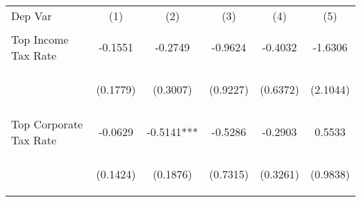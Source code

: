 \begin{center}
\begin{tabular}{lccccc}
\hline \noalign{\smallskip}Dep Var & (1) & (2) & (3) & (4) & (5)\\
\noalign{\smallskip}\hline \noalign{\smallskip}Top Income Tax Rate & \begin{scriptsize}-0.1551\end{scriptsize} & \begin{scriptsize}-0.2749\end{scriptsize} & \begin{scriptsize}-0.9624\end{scriptsize} & \begin{scriptsize}-0.4032\end{scriptsize} & \begin{scriptsize}-1.6306\end{scriptsize}\\
 & \begin{scriptsize}(0.1779)\end{scriptsize} & \begin{scriptsize}(0.3007)\end{scriptsize} & \begin{scriptsize}(0.9227)\end{scriptsize} & \begin{scriptsize}(0.6372)\end{scriptsize} & \begin{scriptsize}(2.1044)\end{scriptsize}\\
\noalign{\smallskip}Top Corporate Tax Rate & \begin{scriptsize}-0.0629\end{scriptsize} & \begin{scriptsize}-0.5141***\end{scriptsize} & \begin{scriptsize}-0.5286\end{scriptsize} & \begin{scriptsize}-0.2903\end{scriptsize} & \begin{scriptsize}0.5533\end{scriptsize}\\
 & \begin{scriptsize}(0.1424)\end{scriptsize} & \begin{scriptsize}(0.1876)\end{scriptsize} & \begin{scriptsize}(0.7315)\end{scriptsize} & \begin{scriptsize}(0.3261)\end{scriptsize} & \begin{scriptsize}(0.9838)\end{scriptsize}\\

\end{tabular}
\end{center}
